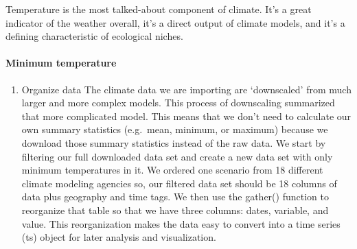 \documentclass[
  paper=a4,
  ,captions=tableheading
]{scrartcl}
\newenvironment{Shaded}{\begin{snugshade}}{\end{snugshade}}
\newcommand{\AttributeTok}[1]{\textcolor[rgb]{0.77,0.63,0.00}{#1}}
\newcommand{\DecValTok}[1]{\textcolor[rgb]{0.00,0.00,0.81}{#1}}
\newcommand{\FunctionTok}[1]{\textcolor[rgb]{0.00,0.00,0.00}{#1}}
\newcommand{\NormalTok}[1]{#1}
\newcommand{\OtherTok}[1]{\textcolor[rgb]{0.56,0.35,0.01}{#1}}
\newcommand{\SpecialCharTok}[1]{\textcolor[rgb]{0.00,0.00,0.00}{#1}}
\newcommand{\StringTok}[1]{\textcolor[rgb]{0.31,0.60,0.02}{#1}}
\providecommand{\tightlist}{%
  \setlength{\itemsep}{0pt}\setlength{\parskip}{0pt}}
\begin{document}
Temperature is the most talked-about component of climate. It's a great
indicator of the weather overall, it's a direct output of climate
models, and it's a defining characteristic of ecological niches.

\hypertarget{minimum-temperature}{%
\paragraph{Minimum temperature}\label{minimum-temperature}}

\begin{enumerate}
\def\labelenumi{\arabic{enumi}.}
\tightlist
\item
  Organize data The climate data we are importing are `downscaled' from
  much larger and more complex models. This process of downscaling
  summarized that more complicated model. This means that we don't need
  to calculate our own summary statistics (e.g.~mean, minimum, or
  maximum) because we download those summary statistics instead of the
  raw data. We start by filtering our full downloaded data set and
  create a new data set with only minimum temperatures in it. We ordered
  one scenario from 18 different climate modeling agencies so, our
  filtered data set should be 18 columns of data plus geography and time
  tags. We then use the gather() function to reorganize that table so
  that we have three columns: dates, variable, and value. This
  reorganization makes the data easy to convert into a time series (ts)
  object for later analysis and visualization.
\end{enumerate}

\begin{Shaded}
\end{Shaded}
\end{document}

